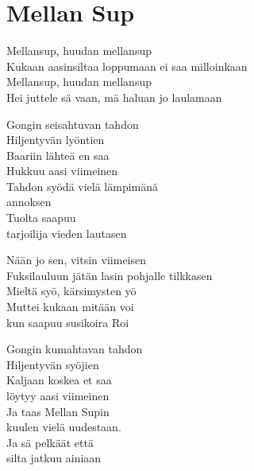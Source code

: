 \section{Mellan Sup}
Mellansup, huudan mellansup\\
Kukaan aasinsiltaa loppumaan ei saa milloinkaan\\
Mellansup, huudan mellansup\\
Hei juttele sä vaan, mä haluan jo laulamaan

Gongin seisahtuvan tahdon\\
Hiljentyvän lyöntien\\
Baariin lähteä en saa\\
Hukkuu aasi viimeinen\\
Tahdon syödä vielä lämpimänä\\
annoksen\\
Tuolta saapuu\\
tarjoilija vieden lautasen

Nään jo sen, vitsin viimeisen\\
Fuksilauluun jätän lasin pohjalle tilkkasen\\
Mieltä syö, kärsimysten yö\\
Muttei kukaan mitään voi\\
kun saapuu susikoira Roi

Gongin kumahtavan tahdon\\
Hiljentyvän syöjien\\
Kaljaan koskea et saa\\
löytyy aasi viimeinen\\
Ja taas Mellan Supin\\
kuulen vielä uudestaan.\\
Ja sä pelkäät että\\
silta jatkuu ainiaan